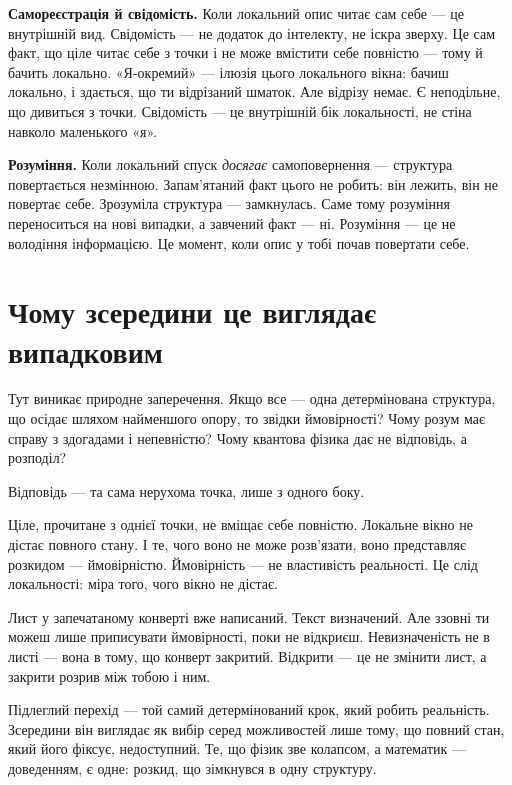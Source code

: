 \documentclass[12pt, a4paper, openany]{book}
\begin{document}
\textbf{Самореєстрація й свідомість.} Коли локальний опис читає сам себе --- це внутрішній вид. Свідомість --- не додаток до інтелекту, не іскра зверху. Це сам факт, що ціле читає себе з точки і не може вмістити себе повністю --- тому й бачить локально. «Я-окремий» --- ілюзія цього локального вікна: бачиш локально, і здається, що ти відрізаний шматок. Але відрізу немає. Є неподільне, що дивиться з точки. Свідомість --- це внутрішній бік локальності, не стіна навколо маленького «я».

\textbf{Розуміння.} Коли локальний спуск \emph{досягає} самоповернення --- структура повертається незмінною. Запам'ятаний факт цього не робить: він лежить, він не повертає себе. Зрозуміла структура --- замкнулась. Саме тому розуміння переноситься на нові випадки, а завчений факт --- ні. Розуміння --- це не володіння інформацією. Це момент, коли опис у тобі почав повертати себе.

\section{Чому зсередини це виглядає випадковим}

Тут виникає природне заперечення. Якщо все --- одна детермінована структура, що осідає шляхом найменшого опору, то звідки ймовірності? Чому розум має справу з здогадами і непевністю? Чому квантова фізика дає не відповідь, а розподіл?

Відповідь --- та сама нерухома точка, лише з одного боку.

Ціле, прочитане з однієї точки, не вміщає себе повністю. Локальне вікно не дістає повного стану. І те, чого воно не може розв'язати, воно представляє розкидом --- ймовірністю. Ймовірність --- не властивість реальності. Це слід локальності: міра того, чого вікно не дістає.

\begin{analogybox}
Лист у запечатаному конверті вже написаний. Текст визначений. Але ззовні ти можеш лише приписувати ймовірності, поки не відкриєш. Невизначеність не в листі --- вона в тому, що конверт закритий. Відкрити --- це не змінити лист, а закрити розрив між тобою і ним.
\end{analogybox}

Підлеглий перехід --- той самий детермінований крок, який робить реальність. Зсередини він виглядає як вибір серед можливостей лише тому, що повний стан, який його фіксує, недоступний. Те, що фізик зве колапсом, а математик --- доведенням, є одне: розкид, що зімкнувся в одну структуру.
\end{document}
